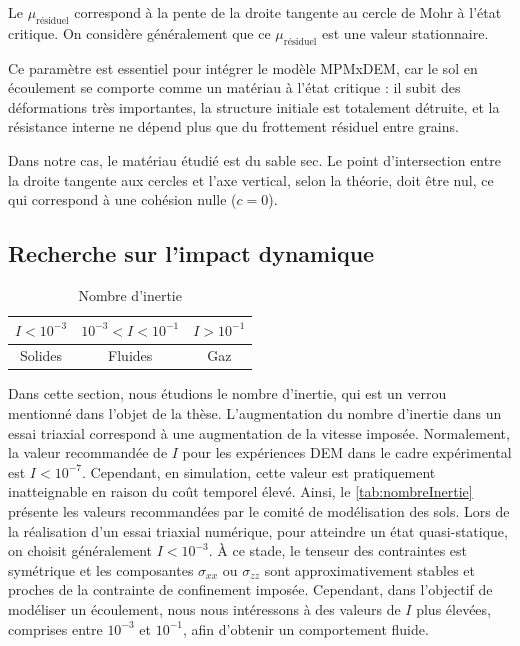 \documentclass[a4paper,12pt]{report}
\begin{document}
Le $\mu_{\text{résiduel}}$ correspond à la pente de la droite tangente au cercle de Mohr à l’état critique.  
On considère généralement que ce $\mu_{\text{résiduel}}$ est une valeur stationnaire.  

Ce paramètre est essentiel pour intégrer le modèle MPMxDEM, car le sol en écoulement se comporte comme un matériau à l’état critique :  
il subit des déformations très importantes, la structure initiale est totalement détruite, et la résistance interne ne dépend plus que du frottement résiduel entre grains.  

Dans notre cas, le matériau étudié est du sable sec. Le point d’intersection entre la droite tangente aux cercles et l’axe vertical, selon la théorie, doit être nul, ce qui correspond à une cohésion nulle ($c=0$).

\subsection{Recherche sur l'impact dynamique} \label{sec:dynamique}
\begin{table}[h!]
\centering
\begin{tabular}{|c|c|c|}
\hline
$ I < 10^{-3} $ & $ 10^{-3} < I < 10^{-1} $ & $ I > 10^{-1} $ \\ 
\hline
Solides & Fluides & Gaz \\  
\hline
\end{tabular}
\caption{Nombre d’inertie}
\label{tab:nombreInertie}
\end{table}

Dans cette section, nous étudions le nombre d’inertie, qui est un verrou mentionné dans l’objet de la thèse.  
L’augmentation du nombre d’inertie dans un essai triaxial correspond à une augmentation de la vitesse imposée.  
Normalement, la valeur recommandée de $I$ pour les expériences DEM dans le cadre expérimental est $I < 10^{-7}$.  
Cependant, en simulation, cette valeur est pratiquement inatteignable en raison du coût temporel élevé.  
Ainsi, le \autoref{tab:nombreInertie} présente les valeurs recommandées par le comité de modélisation des sols.  
Lors de la réalisation d’un essai triaxial numérique, pour atteindre un état quasi-statique, on choisit généralement $I < 10^{-3}$.  
À ce stade, le tenseur des contraintes est symétrique et les composantes $\sigma_{xx}$ ou $\sigma_{zz}$ sont approximativement stables et proches de la contrainte de confinement imposée.  
Cependant, dans l’objectif de modéliser un écoulement, nous nous intéressons à des valeurs de $I$ plus élevées, comprises entre $10^{-3}$ et $10^{-1}$, afin d’obtenir un comportement fluide.
\end{document}
